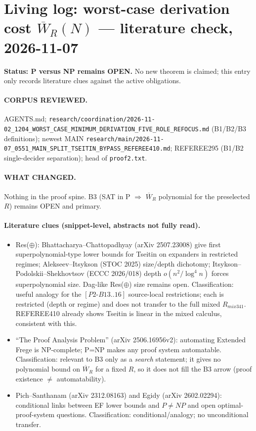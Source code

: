 \documentclass{article}
\begin{document}
\section*{Living log: worst-case derivation cost $\overline W_R(N)$ --- literature check, 2026-11-07}
\textbf{Status: P versus NP remains OPEN.} No new theorem is claimed; this entry only records literature clues against the active obligations.

\paragraph{CORPUS REVIEWED.} AGENTS.md; \texttt{research/coordination/2026-11-02\_1204\_WORST\_CASE\_MINIMUM\_DERIVATION\_FIVE\_ROLE\_REFOCUS.md} (B1/B2/B3 definitions); newest MAIN \texttt{research/main/2026-11-07\_0551\_MAIN\_SPLIT\_TSEITIN\_BYPASS\_REFEREE410.md}; REFEREE295 (B1/B2 single-decider separation); head of \texttt{proof2.txt}.

\paragraph{WHAT CHANGED.} Nothing in the proof spine. B3 (SAT in P $\Rightarrow$ $\overline W_R$ polynomial for the preselected $R$) remains OPEN and primary.

\paragraph{Literature clues (snippet-level, abstracts not fully read).}
\begin{itemize}
\item Res($\oplus$): Bhattacharya--Chattopadhyay (arXiv 2507.23008) give first superpolynomial-type lower bounds for Tseitin on expanders in restricted regimes; Alekseev--Itsykson (STOC 2025) size/depth dichotomy; Itsykson--Podolskii--Shekhovtsov (ECCC 2026/018) depth $o(n^2/\log^4 n)$ forces superpolynomial size. Dag-like Res($\oplus$) size remains open. Classification: useful analogy for the $[P2\text{-}B13..16]$ source-local restrictions; each is restricted (depth or regime) and does not transfer to the full mixed $R_{mix341}$. REFEREE410 already shows Tseitin is linear in the mixed calculus, consistent with this.
\item ``The Proof Analysis Problem'' (arXiv 2506.16956v2): automating Extended Frege is NP-complete; P=NP makes any proof system automatable. Classification: relevant to B3 only as a \emph{search} statement; it gives no polynomial bound on $\overline W_R$ for a fixed $R$, so it does not fill the B3 arrow (proof existence $\neq$ automatability).
\item Pich--Santhanam (arXiv 2312.08163) and Egidy (arXiv 2602.02294): conditional links between EF lower bounds and $P\ne NP$ and open optimal-proof-system questions. Classification: conditional/analogy; no unconditional transfer.
\end{itemize}
\end{document}
